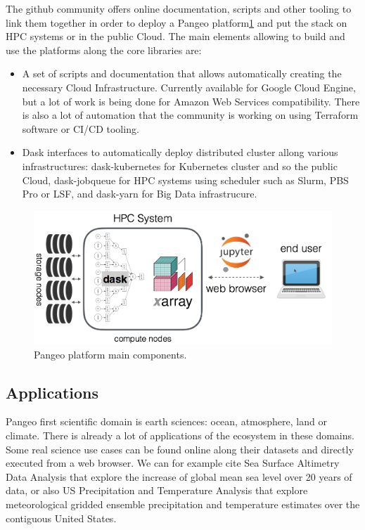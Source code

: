 \documentclass{article}
\begin{document}
The github community offers online documentation, scripts and other tooling to link them together in order to deploy a Pangeo platform\ref{pangeo_stack} and put the stack on HPC systems or in the public Cloud. The main elements allowing to build and use the platforms along the core libraries are:
\begin{itemize}
\item A set of scripts and documentation that allows automatically creating the necessary Cloud Infrastructure. Currently available for Google Cloud Engine, but a lot of work is being done for Amazon Web Services compatibility. There is also a lot of automation that the community is working on using Terraform software or CI/CD tooling.
\item Dask interfaces to automatically deploy distributed cluster allong various infrastructures: dask-kubernetes for Kubernetes cluster and so the public Cloud, dask-jobqueue\cite{b4} for HPC systems using scheduler such as Slurm, PBS Pro or LSF, and dask-yarn for Big Data infrastrucure.
\end{itemize}

\begin{figure}
  \centering
  \includegraphics[width=\columnwidth]{pangeo_stack.png}
  \caption{\label{pangeo_stack} Pangeo platform main components.}
\end{figure}

\subsection{Applications}
\label{ssec:applications}

Pangeo first scientific domain is earth sciences: ocean, atmosphere, land or climate. There is already a lot of applications of the ecosystem in these domains. Some real science use cases can be found online\cite{b5} along their datasets and directly executed from a web browser. We can for example cite Sea Surface Altimetry Data Analysis that explore the increase of global mean sea level over 20 years of data, or also US Precipitation and Temperature Analysis that explore meteorological gridded ensemble precipitation and temperature estimates over the contiguous United States.
\end{document}

